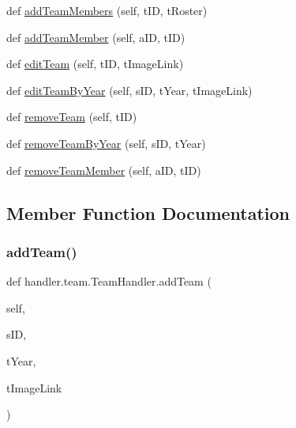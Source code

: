 \begin{DoxyCompactItemize}
\item 
def \hyperlink{classhandler_1_1team_1_1_team_handler_ae689082bd35b83e30cac03ad19d79ba5}{add\+Team\+Members} (self, t\+ID, t\+Roster)
\item 
def \hyperlink{classhandler_1_1team_1_1_team_handler_a1f3809c59410d793a9b5db0de1a3b6b8}{add\+Team\+Member} (self, a\+ID, t\+ID)
\item 
def \hyperlink{classhandler_1_1team_1_1_team_handler_a9fc42144b674bd9901dd1100cd8e389e}{edit\+Team} (self, t\+ID, t\+Image\+Link)
\item 
def \hyperlink{classhandler_1_1team_1_1_team_handler_afa5cdac4a2bf859601108dd7e3f7a045}{edit\+Team\+By\+Year} (self, s\+ID, t\+Year, t\+Image\+Link)
\item 
def \hyperlink{classhandler_1_1team_1_1_team_handler_abc55ff5f4532a8486f8c941876dc84ce}{remove\+Team} (self, t\+ID)
\item 
def \hyperlink{classhandler_1_1team_1_1_team_handler_a9edec7a490cd154b7d4033badb1fdacf}{remove\+Team\+By\+Year} (self, s\+ID, t\+Year)
\item 
def \hyperlink{classhandler_1_1team_1_1_team_handler_aac0d812b5de7f390f36d12590429df95}{remove\+Team\+Member} (self, a\+ID, t\+ID)
\end{DoxyCompactItemize}


\subsection{Member Function Documentation}
\mbox{\label{classhandler_1_1team_1_1_team_handler_a5210c4faddfd528492c3ce454a1aed95}} 
\subsubsection{\texorpdfstring{add\+Team()}{addTeam()}}
{\footnotesize\ttfamily def handler.\+team.\+Team\+Handler.\+add\+Team (\begin{DoxyParamCaption}\item[{}]{self,  }\item[{}]{s\+ID,  }\item[{}]{t\+Year,  }\item[{}]{t\+Image\+Link }\end{DoxyParamCaption})}


